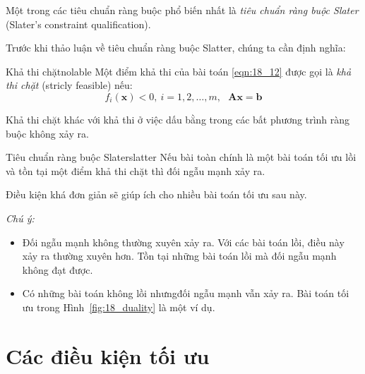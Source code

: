  
Một trong các tiêu chuẩn ràng buộc phổ biến nhất là \textit{tiêu chuẩn ràng buộc Slater} (Slater's constraint qualification).

Trước khi thảo luận về tiêu chuẩn ràng buộc Slatter, chúng ta cần định nghĩa:
\begin{mydef}{Khả thi chặt}{nolable}
Một điểm khả thi của bài toán \eqref{eqn:18_12} 
được gọi là  \textit{khả thi chặt} (stricly feasible) nếu: 
\begin{equation*} 
f_i(\mathbf{x}) < 0, ~i = 1, 2, \dots, m, ~~~ \mathbf{Ax} = \mathbf{b} 
\end{equation*} 
\end{mydef}
Khả thi chặt khác với khả thi ở việc dấu bằng trong các bất phương trình ràng buộc không xảy ra. 

\begin{mytheo}{Tiêu chuẩn ràng buộc Slater}{slatter}
    Nếu bài toàn chính là một bài toán tối ưu lồi và tồn tại một điểm khả thi chặt thì đối ngẫu mạnh xảy ra. 
\end{mytheo}
Điều kiện khá đơn giản sẽ giúp ích cho nhiều bài toán tối ưu sau này.  
 
\textit{Chú ý:}  
\begin{itemize}
    \item Đối ngẫu mạnh không thường xuyên xảy ra. Với các bài toán lồi, 
    điều này xảy ra {thường xuyên hơn}. Tồn tại những bài toán lồi mà đối ngẫu mạnh không đạt được.     
    
    \item Có những bài toán không lồi nhưngđối ngẫu mạnh vẫn xảy ra. 
    Bài toán tối ưu trong Hình~\ref{fig:18_duality} là một ví dụ. 
\end{itemize}
 
\section{Các điều kiện tối ưu}
